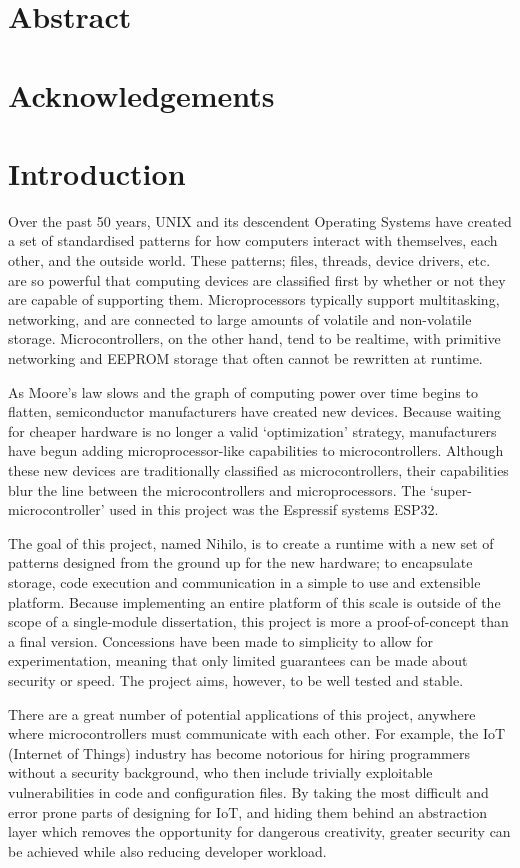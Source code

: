 \documentclass{article}
\begin{document}
\section{Abstract}
\section{Acknowledgements}

\tableofcontents
\section{Introduction}
Over the past 50 years, UNIX and its descendent Operating Systems have created a set of standardised patterns for how computers interact with themselves, each other, and the outside world.
These patterns; files, threads, device drivers, etc. are so powerful that computing devices are classified first by whether or not they are capable of supporting them.
Microprocessors typically support multitasking, networking, and are connected to large amounts of volatile and non-volatile storage.
Microcontrollers, on the other hand, tend to be realtime, with primitive networking and EEPROM storage that often cannot be rewritten at runtime.

As Moore's law slows and the graph of computing power over time begins to flatten, semiconductor manufacturers have created new devices.
Because waiting for cheaper hardware is no longer a valid \lq optimization' strategy, manufacturers have begun adding microprocessor-like capabilities to microcontrollers.
Although these new devices are traditionally classified as microcontrollers, their capabilities blur the line between the microcontrollers and microprocessors.
The \lq super-microcontroller' used in this project was the Espressif systems ESP32.

The goal of this project, named Nihilo, is to create a runtime with a new set of patterns designed from the ground up for the new hardware; to encapsulate storage, code execution and communication in a simple to use and extensible platform.
Because implementing an entire platform of this scale is outside of the scope of a single-module dissertation, this project is more a proof-of-concept than a final version.
Concessions have been made to simplicity to allow for experimentation, meaning that only limited guarantees can be made about security or speed.
The project aims, however, to be well tested and stable.

There are a great number of potential applications of this project, anywhere where microcontrollers must communicate with each other. For example, the IoT (Internet of Things) industry has become notorious for hiring programmers without a security background, who then include trivially exploitable vulnerabilities in code and configuration files\cite{internetofsh}. By taking the most difficult and error prone parts of designing for IoT, and hiding them behind an abstraction layer which removes the opportunity for dangerous creativity, greater security can be achieved while also reducing developer workload.
\end{document}
